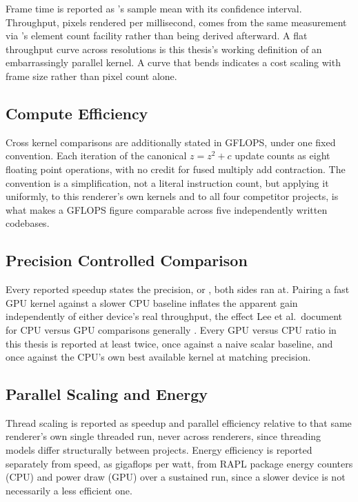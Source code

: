 \documentclass{ftndiplomski}
\begin{document}
Frame time is reported as 's sample mean with its
confidence interval. Throughput, pixels rendered per millisecond, comes
from the same measurement via 's element count facility
rather than being derived afterward. A flat throughput curve across
resolutions is this thesis's working definition of an embarrassingly
parallel kernel. A curve that bends indicates a cost scaling with frame
size rather than pixel count alone.

\subsection{Compute Efficiency}
\label{sec:metrics-gflops}

Cross kernel comparisons are additionally stated in GFLOPS, under one
fixed convention. Each iteration of the canonical $z = z^2 + c$ update
counts as eight floating point operations, with no credit for
fused multiply add contraction. The convention is a simplification, not a
literal instruction count, but applying it uniformly, to this renderer's
own kernels and to all four competitor projects, is what makes a GFLOPS
figure comparable across five independently written codebases.

\subsection{Precision Controlled Comparison}
\label{sec:metrics-precision}

Every reported speedup states the precision,  or , both
sides ran at. Pairing a fast  GPU kernel against a slower
 CPU baseline inflates the apparent gain independently of either
device's real throughput, the effect Lee et al.\ document for CPU versus
GPU comparisons generally \cite{lee2010debunking}. Every GPU versus CPU
ratio in this thesis is reported at least twice, once against a naive
scalar baseline, and once against the CPU's own best available kernel at
matching precision.

\subsection{Parallel Scaling and Energy}
\label{sec:scaling-energy}

Thread scaling is reported as speedup and parallel efficiency relative to
that same renderer's own single threaded run, never across renderers,
since threading models differ structurally between projects. Energy
efficiency is reported separately from speed, as gigaflops per watt, from
RAPL package energy counters (CPU) and  power draw (GPU)
over a sustained run, since a slower device is not necessarily a less
efficient one.
\end{document}
